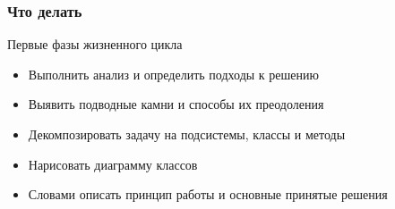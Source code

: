 \documentclass[xetex,mathserif,serif]{beamer}
\begin{document}
	\begin{frame}
		\frametitle{Что делать}
		Первые фазы жизненного цикла
		\begin{itemize}
			\item Выполнить анализ и определить подходы к решению
			\item Выявить подводные камни и способы их преодоления
			\item Декомпозировать задачу на подсистемы, классы и методы
			\item Нарисовать диаграмму классов
			\item Словами описать принцип работы и основные принятые решения
		\end{itemize}
	\end{frame}
\end{document}
